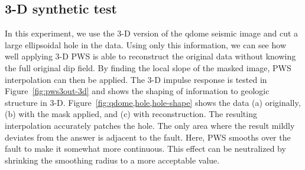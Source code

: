 

\subsection{3-D synthetic test}
In this experiment, we use the 3-D version of the qdome seismic image and cut a large ellipsoidal hole in the data. Using only this information, we can see how well applying 3-D PWS is able to reconstruct the original data without knowing the full original dip field. By finding the local slope of the masked image, PWS interpolation can then be applied. The 3-D impulse response is tested in Figure~\ref{fig:pws3out-3d} and shows the shaping of information to geologic structure in 3-D. Figure~\ref{fig:qdome,hole,hole-shape} shows the data (a) originally, (b) with the mask applied, and (c) with reconstruction. The resulting interpolation accurately patches the hole. The only area where the result mildly deviates from the answer is adjacent to the fault. Here, PWS smooths over the fault to make it somewhat more continuous. This effect can be neutralized by shrinking the smoothing radius to a more acceptable value.


